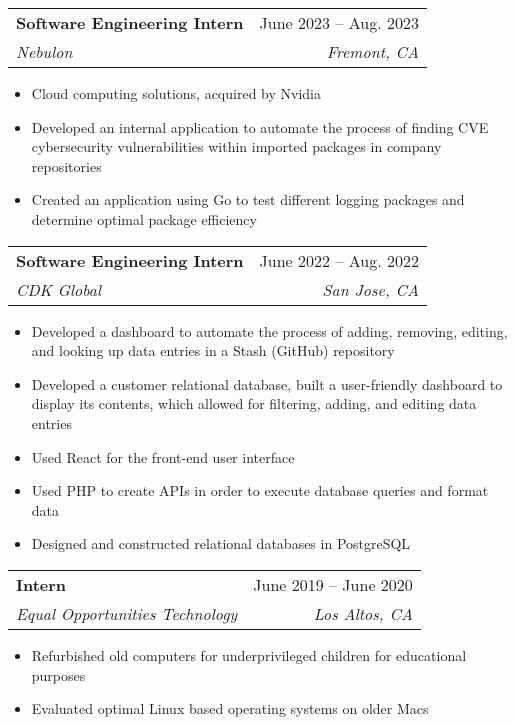 \documentclass[letterpaper,11pt]{article}
\makeatletter
\newcommand{\resumeItem}[1]{
  \item\small{
    {#1 \vspace{-2pt}}
  }
}
\newcommand{\resumeSubheading}[4]{
  \vspace{-2pt}\item
    \begin{tabular*}{0.97\textwidth}[t]{l@{\extracolsep{\fill}}r}
      \textbf{#1} & #2 \\
      \textit{\small#3} & \textit{\small #4} \\
    \end{tabular*}\vspace{-7pt}
}
\newcommand{\resumeSubSubheading}[2]{
    \item
    \begin{tabular*}{0.97\textwidth}{l@{\extracolsep{\fill}}r}
      \textit{\small#1} & \textit{\small #2} \\
    \end{tabular*}\vspace{-7pt}
}
\newcommand{\resumeSubHeadingListEnd}{\end{itemize}}
\newcommand{\resumeItemListStart}{\begin{itemize}}
\newcommand{\resumeItemListEnd}{\end{itemize}\vspace{-5pt}}
\makeatother
\begin{document}

    \resumeSubheading
      {Software Engineering Intern}{June 2023 -- Aug. 2023}
      {Nebulon}{Fremont, CA}
      \resumeItemListStart
        \resumeItem{Cloud computing solutions, acquired by Nvidia}
        \resumeItem{\begin{minipage}[t]{0.65\textwidth}\raggedright
                Developed an internal application to automate the process of finding CVE cybersecurity vulnerabilities within imported packages in company repositories
            \end{minipage}}
        \resumeItem{\begin{minipage}[t]{0.65\textwidth}\raggedright
                Created an application using Go to test different logging packages and determine optimal package efficiency
            \end{minipage}}
    \resumeItemListEnd

    \resumeSubheading
      {Software Engineering Intern}{June 2022 -- Aug. 2022}
      {CDK Global}{San Jose, CA}
      \resumeItemListStart
        \resumeItem{\begin{minipage}[t]{0.65\textwidth}\raggedright
                Developed a dashboard to automate the process of adding, removing, editing, and looking up data entries in a Stash (GitHub) repository
            \end{minipage}}
        \resumeItem{\begin{minipage}[t]{0.65\textwidth}\raggedright
                Developed a customer relational database, built a user-friendly dashboard to display its contents, which allowed for filtering, adding, and editing data entries
            \end{minipage}}
        \resumeItem{Used React for the front-end user interface}
        \resumeItem{Used PHP to create APIs in order to execute database queries and format data}
        \resumeItem{Designed and constructed relational databases in PostgreSQL}
      \resumeItemListEnd

    \resumeSubheading
        {Intern}{June 2019 -- June 2020}
        {Equal Opportunities Technology}{Los Altos, CA}
        \resumeItemListStart
            \resumeItem{Refurbished old computers for underprivileged children for educational purposes}
            \resumeItem{Evaluated optimal Linux based operating systems on older Macs}
        \resumeItemListEnd
\end{document}
